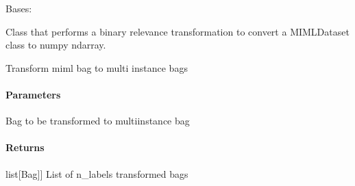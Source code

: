 \documentclass[letterpaper,10pt,english]{sphinxmanual}
\begin{document}
\begin{fulllineitems}
\label{\detokenize{transformation/mimlTOmi/_autosummary/miml.transformation.mimlTOmi.binary_relevance_transformation.BinaryRelevanceTransformation:miml.transformation.mimlTOmi.binary_relevance_transformation.BinaryRelevanceTransformation}}
\pysigstartsignatures
{}
\pysigstopsignatures
\sphinxAtStartPar
Bases: 

\sphinxAtStartPar
Class that performs a binary relevance transformation to convert a MIMLDataset class to numpy ndarray.

\begin{fulllineitems}
\label{\detokenize{transformation/mimlTOmi/_autosummary/miml.transformation.mimlTOmi.binary_relevance_transformation.BinaryRelevanceTransformation:miml.transformation.mimlTOmi.binary_relevance_transformation.BinaryRelevanceTransformation.transform_bag}}
\pysigstartsignatures
{}
\pysigstopsignatures
\sphinxAtStartPar
Transform miml bag to multi instance bags


\paragraph{Parameters}
\label{\detokenize{transformation/mimlTOmi/_autosummary/miml.transformation.mimlTOmi.binary_relevance_transformation.BinaryRelevanceTransformation:parameters}}\begin{description}
\sphinxAtStartPar
Bag to be transformed to multi\sphinxhyphen{}instance bag

\end{description}


\paragraph{Returns}
\label{\detokenize{transformation/mimlTOmi/_autosummary/miml.transformation.mimlTOmi.binary_relevance_transformation.BinaryRelevanceTransformation:returns}}\begin{description}
\sphinxlineitem{bags}{[}list{[}Bag{]}{]}
\sphinxAtStartPar
List of n\_labels transformed bags


\end{description}
\end{fulllineitems}
\end{fulllineitems}
\end{document}
